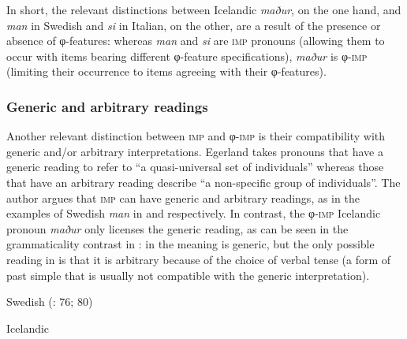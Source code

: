 \documentclass[output=paper]{langscibook}
\begin{document}
In short, the relevant distinctions between Icelandic \textit{maður}, on the one hand, and \textit{man} in Swedish and \textit{si} in Italian, on the other, are a result of the presence or absence of φ-fea\-tures: whereas \textit{man} {and} {\textit{si}} {are \textsc{imp} pronouns (allowing them to occur with items bearing different φ-fea\-ture specifications),} {\textit{maður}} {is φ-\textsc{imp} (limiting their occurrence to items agreeing with their φ-fea\-tures).}

\subsubsection{Generic and arbitrary readings}

Another relevant distinction between \textsc{imp} and φ-\textsc{imp} is their compatibility with generic and/or arbitrary interpretations. Egerland takes pronouns that have a generic reading to refer to “a quasi-universal set of individuals” whereas those that have an arbitrary reading describe “a non-specific group of individuals”. The author argues that \textsc{imp} can have generic and arbitrary readings, as in the examples of Swedish {\textit{man} }{in  and  respectively. In contrast, the φ-\textsc{imp} Icelandic pronoun} {\textit{maður} }{only licenses the generic reading, as can be seen in the grammaticality contrast in : in  the meaning is generic, but the only possible reading in  is that it is arbitrary because of the choice of verbal tense (a form of past simple that is usually not compatible with the generic interpretation).}

\ea\label{ex:avelar:10:} Swedish (\citealt{Egerland2003}: 76; 80)
  
\z 

\ex\label{ex:avelar:11} Icelandic \citep[81]{Egerland2003}
\z
\z
\end{document}
